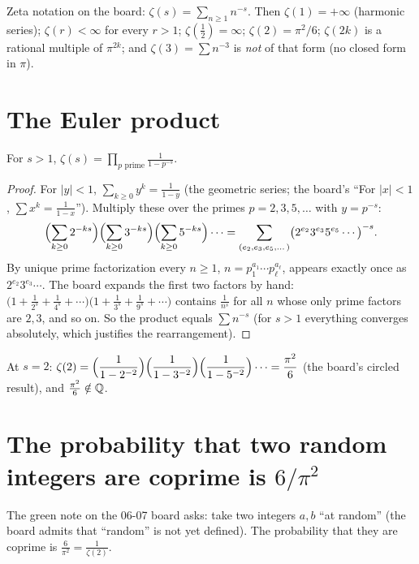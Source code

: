 \documentclass[11pt]{article}
\begin{document}
Zeta notation on the board: $\zeta(s)=\sum_{n\ge1}n^{-s}$. Then $\zeta(1)=+\infty$ (harmonic series); $\zeta(r)<\infty$ for every $r>1$; $\zeta(\tfrac12)=\infty$; $\zeta(2)=\pi^2/6$; $\zeta(2k)$ is a rational multiple of $\pi^{2k}$; and $\zeta(3)=\sum n^{-3}$ is \emph{not} of that form (no closed form in $\pi$).

\section{The Euler product}

\begin{theorem}
For $s>1$, $\displaystyle\zeta(s)=\prod_{p\text{ prime}}\frac1{1-p^{-s}}$.
\end{theorem}
\begin{proof}
For $|y|<1$, $\sum_{k\ge0}y^k=\frac1{1-y}$ (the geometric series; the board's ``For $|x|<1$, $\sum x^k=\frac1{1-x}$''). Multiply these over the primes $p=2,3,5,\dots$ with $y=p^{-s}$:
\[
\Bigl(\sum_{k\ge0}2^{-ks}\Bigr)\Bigl(\sum_{k\ge0}3^{-ks}\Bigr)\Bigl(\sum_{k\ge0}5^{-ks}\Bigr)\cdots=\sum_{(e_2,e_3,e_5,\dots)}\bigl(2^{e_2}3^{e_3}5^{e_5}\cdots\bigr)^{-s}.
\]
By unique prime factorization every $n\ge1$, $n=p_1^{a_1}\cdots p_\ell^{a_\ell}$, appears exactly once as $2^{e_2}3^{e_3}\cdots$. The board expands the first two factors by hand: $\bigl(1+\frac1{2^s}+\frac1{4^s}+\cdots\bigr)\bigl(1+\frac1{3^s}+\frac1{9^s}+\cdots\bigr)$ contains $\frac1{n^s}$ for all $n$ whose only prime factors are $2,3$, and so on. So the product equals $\sum n^{-s}$ (for $s>1$ everything converges absolutely, which justifies the rearrangement).
\end{proof}

At $s=2$: $\zeta(2)=\Bigl(\dfrac1{1-2^{-2}}\Bigr)\Bigl(\dfrac1{1-3^{-2}}\Bigr)\Bigl(\dfrac1{1-5^{-2}}\Bigr)\cdots=\dfrac{\pi^2}6$ (the board's circled result), and $\frac{\pi^2}6\notin\mathbb{Q}$.

\section{The probability that two random integers are coprime is $6/\pi^2$}

The green note on the 06-07 board asks: take two integers $a,b$ ``at random'' (the board admits that ``random'' is not yet defined). The probability that they are coprime is $\frac6{\pi^2}=\frac1{\zeta(2)}$.
\end{document}
